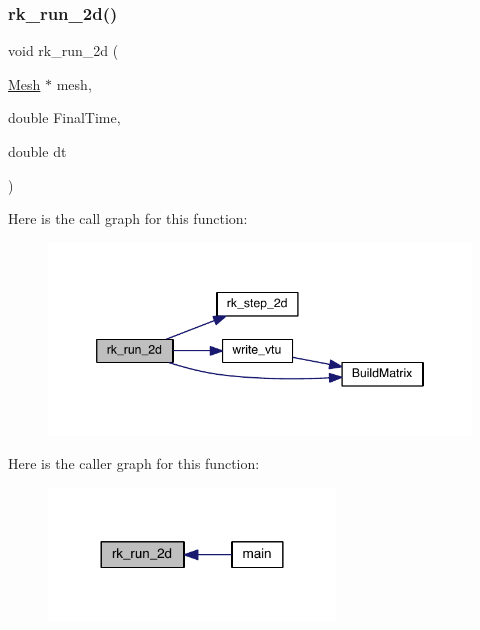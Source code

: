 \subsubsection{\texorpdfstring{rk\+\_\+run\+\_\+2d()}{rk\_run\_2d()}}
{\footnotesize\ttfamily void rk\+\_\+run\+\_\+2d (\begin{DoxyParamCaption}\item[{\hyperlink{a00557_aeffbe0891ab73a4d8964c9cb7978426e}{Mesh} $\ast$}]{mesh,  }\item[{double}]{Final\+Time,  }\item[{double}]{dt }\end{DoxyParamCaption})}

Here is the call graph for this function\+:\nopagebreak
\begin{figure}[H]
\begin{center}
\leavevmode
\includegraphics[width=346pt]{a00584_a21a02761bc746f8e6205d02f662aee16_cgraph}
\end{center}
\end{figure}
Here is the caller graph for this function\+:\nopagebreak
\begin{figure}[H]
\begin{center}
\leavevmode
\includegraphics[width=216pt]{a00584_a21a02761bc746f8e6205d02f662aee16_icgraph}
\end{center}
\end{figure}
\mbox{\label{a00584_a9b253cfe04029e084b403542b0d7a64b}} 
